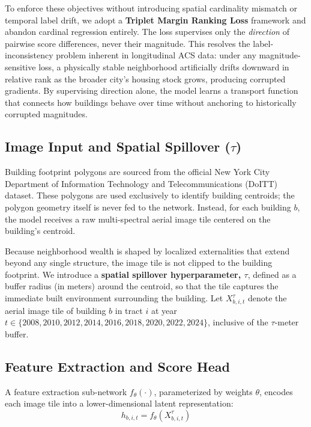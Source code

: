 \documentclass{article}
\begin{document}
To enforce these objectives without introducing spatial cardinality mismatch or temporal label drift, we adopt a \textbf{Triplet Margin Ranking Loss} framework and abandon cardinal regression entirely. The loss supervises only the \textit{direction} of pairwise score differences, never their magnitude. This resolves the label-inconsistency problem inherent in longitudinal ACS data: under any magnitude-sensitive loss, a physically stable neighborhood artificially drifts downward in relative rank as the broader city's housing stock grows, producing corrupted gradients. By supervising direction alone, the model learns a transport function that connects how buildings behave over time without anchoring to historically corrupted magnitudes.

\subsection{Image Input and Spatial Spillover ($\tau$)}

Building footprint polygons are sourced from the official New York City Department of Information Technology and Telecommunications (DoITT) dataset. These polygons are used exclusively to identify building centroids; the polygon geometry itself is never fed to the network. Instead, for each building $b$, the model receives a raw multi-spectral aerial image tile centered on the building's centroid.

Because neighborhood wealth is shaped by localized externalities that extend beyond any single structure, the image tile is not clipped to the building footprint. We introduce a \textbf{spatial spillover hyperparameter, $\tau$}, defined as a buffer radius (in meters) around the centroid, so that the tile captures the immediate built environment surrounding the building. Let $X_{b,i,t}^\tau$ denote the aerial image tile of building $b$ in tract $i$ at year $t \in \{2008, 2010, 2012, 2014, 2016, 2018, 2020, 2022, 2024\}$, inclusive of the $\tau$-meter buffer.

\subsection{Feature Extraction and Score Head}

A feature extraction sub-network $f_\theta(\cdot)$, parameterized by weights $\theta$, encodes each image tile into a lower-dimensional latent representation:
\begin{equation}
h_{b,i,t} = f_\theta\!\left(X_{b,i,t}^\tau\right)
\end{equation}
\end{document}
